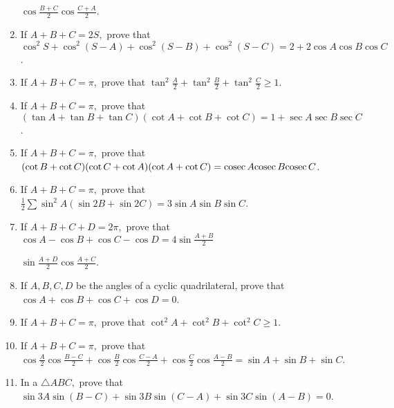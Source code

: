 \begin{enumerate}
  $\cos\frac{B + C}{2}\cos\frac{C + A}{2}$.
\item If $A + B + C = 2S,$ prove that $\cos^2S + \cos^2(S - A) + \cos^2(S - B) + \cos^2(S - C) = 2 + 2\cos A\cos B\cos C$.
\item If $A + B + C = \pi,$ prove that $\tan^2\frac{A}{2} + \tan^2\frac{B}{2} + \tan^2\frac{C}{2}\geq 1$.
\item If $A + B + C = \pi,$ prove that $(\tan A + \tan B + \tan C)(\cot A + \cot B + \cot C) = 1 + \sec A\sec B\sec C$.
\item If $A + B + C = \pi,$ prove that $(\cot B + \cot C)(\cot C + \cot A)(\cot A + \cot C) = {\rm cosec}\,A{\rm cosec}\,B{\rm cosec}\,C$.
\item If $A + B + C = \pi,$ prove that $\frac{1}{2}\sum \sin^2A(\sin 2B + \sin 2C) = 3\sin A\sin B\sin C$.
\item If $A + B + C + D = 2\pi,$ prove that $\cos A - \cos B + \cos C - \cos D = 4\sin\frac{A + B}{2}$

  $\sin\frac{A + D}{2}\cos \frac{A + C}{2}$.
\item If $A, B, C, D$ be the angles of a cyclic quadrilateral, prove that $\cos A + \cos B + \cos C + \cos D = 0$.
\item If $A + B + C = \pi,$ prove that $\cot^2A + \cot^2B + \cot^2C \geq 1$.
\item If $A + B + C = \pi,$ prove that $\cos \frac{A}{2}\cos\frac{B - C}{2} + \cos\frac{B}{2}\cos\frac{C - A}{2} + \cos
  \frac{C}{2}\cos\frac{A -B}{2} = \sin A + \sin B + \sin C$.
\item In a $\triangle ABC,$ prove that $\sin 3A\sin(B - C) + \sin 3B\sin(C - A) + \sin3C\sin(A - B) = 0$.
\end{enumerate}

